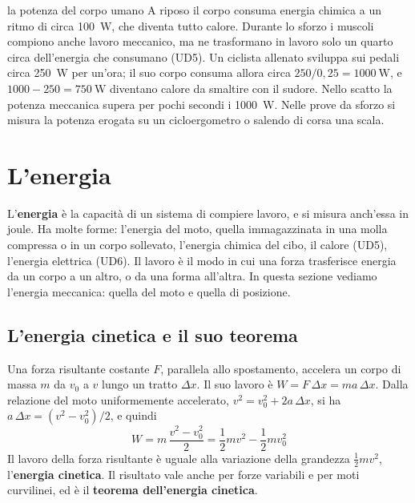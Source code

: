 \begin{applicazione}{la potenza del corpo umano}
A riposo il corpo consuma energia chimica a un ritmo di circa \SI{100}{\watt}, che diventa tutto calore. Durante lo sforzo i muscoli compiono anche lavoro meccanico, ma ne trasformano in lavoro solo un quarto circa dell'energia che consumano (UD5). Un ciclista allenato sviluppa sui pedali circa \SI{250}{\watt} per un'ora; il suo corpo consuma allora circa $250/0{,}25 = \SI{1000}{\watt}$, e $1000 - 250 = \SI{750}{\watt}$ diventano calore da smaltire con il sudore. Nello scatto la potenza meccanica supera per pochi secondi i \SI{1000}{\watt}. Nelle prove da sforzo si misura la potenza erogata su un cicloergometro o salendo di corsa una scala.
\end{applicazione}



\section{L'energia}
\label{sec:ud2-energia}

L'\textbf{energia} è la capacità di un sistema di compiere lavoro, e si misura anch'essa in joule. Ha molte forme: l'energia del moto, quella immagazzinata in una molla compressa o in un corpo sollevato, l'energia chimica del cibo, il calore (UD5), l'energia elettrica (UD6). Il lavoro è il modo in cui una forza trasferisce energia da un corpo a un altro, o da una forma all'altra. In questa sezione vediamo l'energia meccanica: quella del moto e quella di posizione.

\subsection{L'energia cinetica e il suo teorema}

Una forza risultante costante $F$, parallela allo spostamento, accelera un corpo di massa $m$ da $v_0$ a $v$ lungo un tratto $\Delta x$. Il suo lavoro è $W = F\,\Delta x = m a\,\Delta x$. Dalla relazione del moto uniformemente accelerato, $v^2 = v_0^2 + 2a\,\Delta x$, si ha $a\,\Delta x = (v^2 - v_0^2)/2$, e quindi
\[
  W = m\,\frac{v^2 - v_0^2}{2} = \frac12 m v^2 - \frac12 m v_0^2
\]
Il lavoro della forza risultante è uguale alla variazione della grandezza $\frac12 mv^2$, l'\textbf{energia cinetica}. Il risultato vale anche per forze variabili e per moti curvilinei, ed è il \textbf{teorema dell'energia cinetica}.

